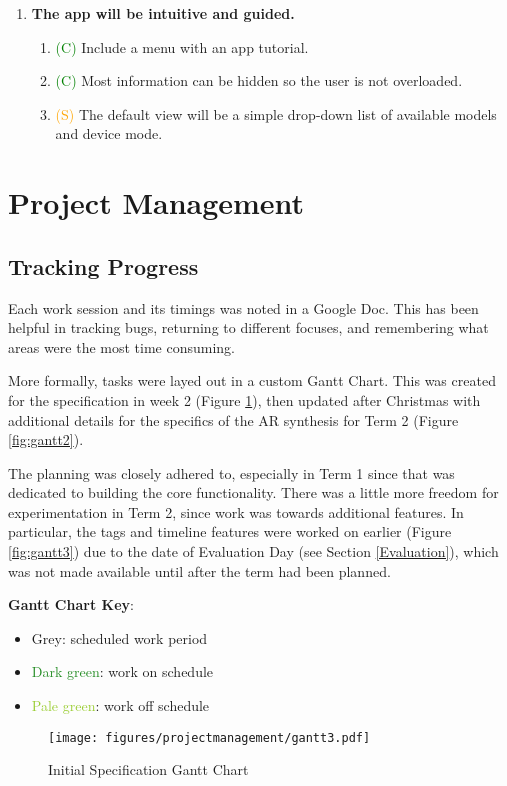 \documentclass[12pt, a4paper]{article}
\newcommand{\light}[1]{\textcolor{mygrey}{#1}}
\newcommand{\should}[1]{\textcolor{orange}{#1}}
\newcommand{\could}[1]{\textcolor{green}{#1}}
\begin{document}
\begin{enumerate}[label=\Roman*.]
\item \textbf{The app will be intuitive and guided.}
    \begin{enumerate}[label=\arabic*.]
    \item \could{(C)} Include a menu with an app tutorial.
    \item \could{(C)} Most information can be hidden so the user is not overloaded.
    \item \should{(S)} The default view will be a simple drop-down list of available models and device mode.
    \end{enumerate}
\end{enumerate}

\section{Project Management}
\subsection{Tracking Progress}
Each work session and its timings was noted in a Google Doc. This has been helpful in tracking bugs, returning to different focuses, and remembering what areas were the most time consuming.

More formally, tasks were layed out in a custom Gantt Chart. This was created for the specification in week 2 (Figure \ref{fig:gantt1}), then updated after Christmas with additional details for the specifics of the AR synthesis for Term 2 (Figure \ref{fig:gantt2}). 

The planning was closely adhered to, especially in Term 1 since that was dedicated to building the core functionality. There was a little more freedom for experimentation in Term 2, since work was towards additional features. In particular, the tags and timeline features were worked on earlier (Figure \ref{fig:gantt3}) due to the date of Evaluation Day (see Section \ref{Evaluation}), which was not made available until after the term had been planned.

\textbf{Gantt Chart Key}: 
\begin{itemize}
    \item \light{Grey}: scheduled work period
    \item \textcolor{ForestGreen}{Dark green}: work on schedule
    \item \textcolor{YellowGreen}{Pale green}: work off schedule
\end{itemize}

\begin{figure}
    \texttt{[image: figures/projectmanagement/gantt3.pdf]}
        \caption{Initial Specification Gantt Chart}
        \label{fig:gantt1}
\end{figure}
\end{document}
